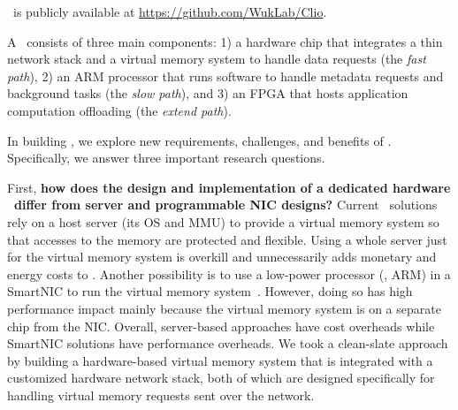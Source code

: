 \sys\ is publicly available at \url{https://github.com/WukLab/Clio}.



A \sysboard\ consists of three main components: 1) a hardware chip that integrates a thin network stack and a virtual memory system to handle data requests (the {\em fast path}), 2) an ARM processor that runs software to handle metadata requests and background tasks (the {\em slow path}), and 3) an FPGA that hosts application computation offloading (the {\em extend path}).

In building \sys, we explore new requirements, challenges, and benefits of \md.
Specifically, we answer three important research questions.

First, \textbf{how does the design and implementation of a
dedicated hardware \MN\ differ from server and programmable NIC
designs?}
Current \md\ solutions rely on a host server (its OS and MMU) to provide a virtual memory system so that accesses to the memory are protected and flexible. 
Using a whole server just for the virtual memory system is overkill and unnecessarily adds monetary and energy costs to \md. %
Another possibility is to use a low-power processor (\eg, ARM) in a SmartNIC to run the virtual memory system~\cite{iPipe}. 
However, doing so has high performance impact mainly because the virtual memory system is on a separate chip from the NIC.
Overall, server-based approaches have cost overheads while SmartNIC solutions have performance overheads.
We took a clean-slate approach by building a hardware-based virtual memory system that is integrated with a customized hardware network stack, 
both of which are designed specifically for handling virtual memory requests sent over the network.

